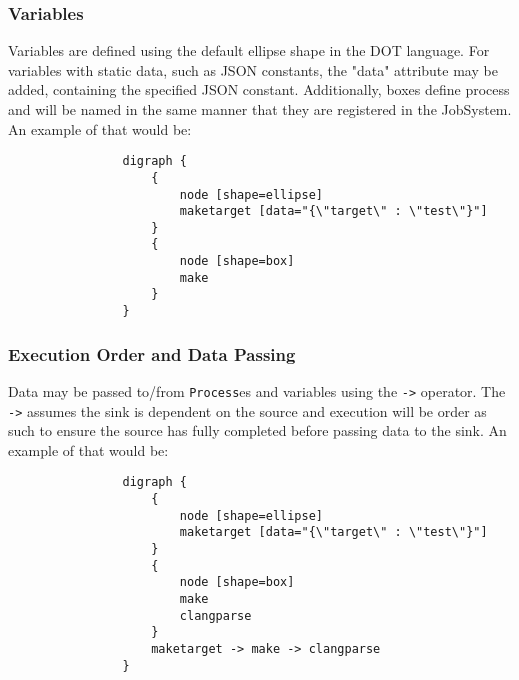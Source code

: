 \documentclass{article}
\begin{document}
			\subsubsection{Variables} Variables are defined using the default ellipse shape in the DOT language. For variables with static data, such as JSON constants, the "data" attribute may be added, containing the specified JSON constant. Additionally, boxes define process and will be named in the same manner that they are registered in the JobSystem. An example of that would be: \\
			\begin{minipage}{0.5\textwidth}
				\begin{verbatim}
				digraph {
				    {
				        node [shape=ellipse]
				        maketarget [data="{\"target\" : \"test\"}"]
				    }
				    {
				        node [shape=box]
				        make
				    }
				}
				\end{verbatim}
			\end{minipage}
			\begin{minipage}{0.5\textwidth}
				\centering
				
			\end{minipage}

			\subsubsection{Execution Order and Data Passing} Data may be passed to/from \texttt{Process}es and variables using the \texttt{->} operator. The \texttt{->} assumes the sink is dependent on the source and execution will be order as such to ensure the source has fully completed before passing data to the sink. An example of that would be: \\
			\begin{minipage}{0.5\textwidth}
				\begin{verbatim}
				digraph {
				    {
				        node [shape=ellipse]
				        maketarget [data="{\"target\" : \"test\"}"]
				    }
				    {
				        node [shape=box]
				        make
						clangparse
				    }
				    maketarget -> make -> clangparse
				}
				\end{verbatim}
			\end{minipage}
			\begin{minipage}{0.5\textwidth}
				\centering
				
			\end{minipage}
			
\end{document}
